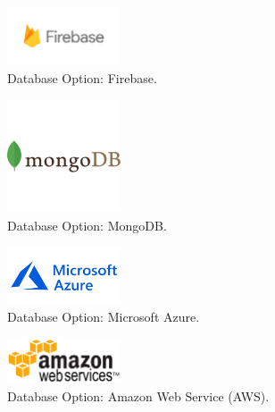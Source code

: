 \begin{figure}[h!]
	\caption{Database Option: Firebase.}
	\label{image:firebase}
	\centering
	\includegraphics[width=0.3\textwidth]{images/firebase.png}
\end{figure}

\begin{figure}[h!]
	\caption{Database Option: MongoDB.}
	\label{image:mongodb}
	\centering
	\includegraphics[width=0.3\textwidth]{images/mongodb.png}
\end{figure}

\newpage

\begin{figure}[h!]
	\caption{Database Option: Microsoft Azure.}
	\label{image:azure}
	\centering
	\includegraphics[width=0.3\textwidth]{images/azure.png}
\end{figure}

\begin{figure}[h!]
	\caption{Database Option: Amazon Web Service (AWS).}
	\label{image:aws}
	\centering
	\includegraphics[width=0.3\textwidth]{images/aws.png}
\end{figure}


